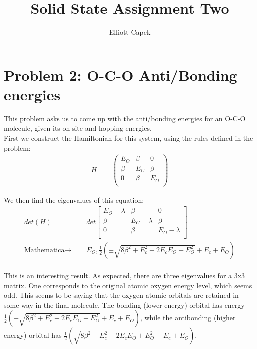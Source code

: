 \documentclass[10pt]{article} %
\title{Solid State Assignment Two}
\author{Elliott Capek}
\begin{document}
\maketitle{}

\section{Problem 2: O-C-O Anti/Bonding energies}
This problem asks us to come up with the anti/bonding energies for an O-C-O molecule, given its
on-site and hopping energies.\\

First we construct the Hamiltonian for this system, using the rules defined in the problem:\\

\begin{align*}
  H &=
  \begin{pmatrix}
    E_O & \beta & 0\\
    \beta & E_C & \beta\\
    0 & \beta & E_O\\
  \end{pmatrix}
\end{align*}

We then find the eigenvalues of this equation:\\

\begin{align*}
  det(H) &=
  det\begin{bmatrix}
    E_O-\lambda & \beta & 0\\
    \beta & E_C-\lambda & \beta\\
    0 & \beta & E_O-\lambda\\
  \end{bmatrix}\\
  \mbox{Mathematica} \rightarrow
  &= E_O, \frac{1}{2}\left(\pm\sqrt{8\beta^2 + E_c^2 - 2E_cE_O + E_O^2} + E_c + E_O\right)\\
\end{align*}

This is an interesting result. As expected, there are three eigenvalues for a 3x3 matrix. One
corresponds to the original atomic oxygen energy level, which seems odd. This seems to be saying
that the oxygen atomic orbitals are retained in some way in the final molecule. The bonding
(lower energy) orbital has energy
$\frac{1}{2}\left(-\sqrt{8\beta^2 + E_c^2 - 2E_cE_O + E_O^2} + E_c + E_O\right)$, while the
antibonding (higher energy) orbital has
$\frac{1}{2}\left(\sqrt{8\beta^2 + E_c^2 - 2E_cE_O + E_O^2} + E_c + E_O\right)$.
\end{document}
